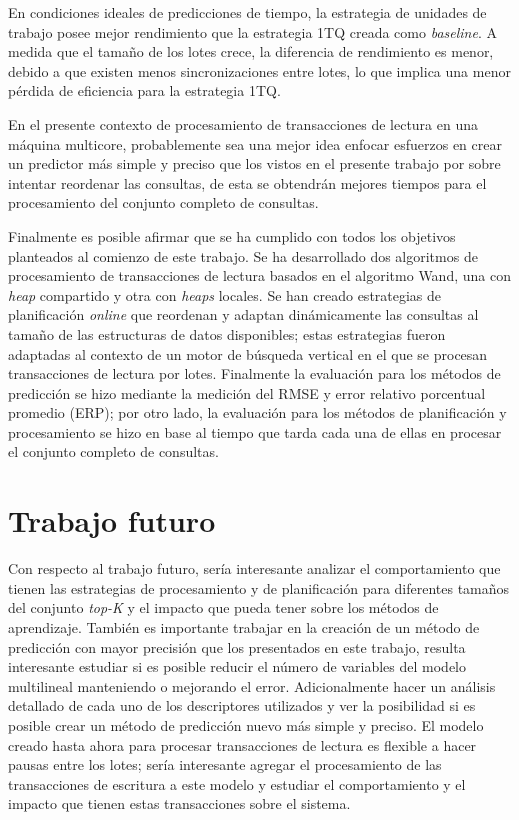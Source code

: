 En condiciones ideales de predicciones de tiempo, la estrategia de unidades de trabajo posee mejor rendimiento que la estrategia 1TQ creada como \textit{baseline}. A medida que el tamaño de los lotes crece, la diferencia de rendimiento es menor, debido a que existen menos sincronizaciones entre lotes, lo que implica una menor pérdida de eficiencia para la estrategia 1TQ.

En el presente contexto de procesamiento de transacciones de lectura en una máquina multicore, probablemente sea una mejor idea enfocar esfuerzos en crear un predictor más simple y preciso que los vistos en el presente trabajo por sobre intentar reordenar las consultas, de esta se obtendrán mejores tiempos para el procesamiento del conjunto completo de consultas.

Finalmente es posible afirmar que se ha cumplido con todos los objetivos planteados al comienzo de este trabajo. Se ha desarrollado dos algoritmos de procesamiento de transacciones de lectura basados en el algoritmo Wand, una con \textit{heap} compartido y otra con \textit{heaps} locales. Se han creado estrategias de planificación \textit{online} que reordenan y adaptan dinámicamente las consultas al tamaño de las estructuras de datos disponibles; estas estrategias fueron adaptadas al contexto de un motor de búsqueda vertical en el que se procesan transacciones de lectura por lotes. Finalmente la evaluación para los métodos de predicción se hizo mediante la medición del RMSE y error relativo porcentual promedio (ERP); por otro lado, la evaluación para los métodos de planificación y procesamiento se hizo en base al tiempo que tarda cada una de ellas en procesar el conjunto completo de consultas.

\section{Trabajo futuro}
\label{conclu:trabajofuturo}
Con respecto al trabajo futuro, sería interesante analizar el comportamiento que tienen las estrategias de procesamiento y de planificación para diferentes tamaños del conjunto \textit{top-K} y el impacto que pueda tener sobre los métodos de aprendizaje.
También es importante trabajar en la creación de un método de predicción con mayor precisión que los presentados en este trabajo, resulta interesante estudiar si es posible reducir el número de variables del modelo multilineal manteniendo o mejorando el error. Adicionalmente hacer un análisis detallado de cada uno de los descriptores utilizados y ver la posibilidad si es posible crear un método de predicción nuevo más simple y preciso.
El modelo creado hasta ahora para procesar transacciones de lectura es flexible a hacer pausas entre los lotes; sería interesante agregar el procesamiento de las transacciones de escritura a este modelo y estudiar el comportamiento y el impacto que tienen estas transacciones sobre el sistema.